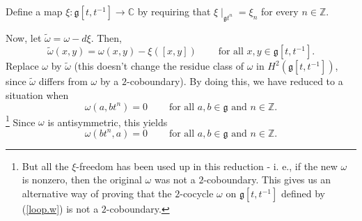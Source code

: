 \documentclass[etingof-lie.tex]{subfiles}
\begin{document}
Define a map $\xi:\mathfrak{g}\left[  t,t^{-1}\right]  \rightarrow\mathbb{C}$
by requiring that $\xi\mid_{\mathfrak{g}t^{n}}=\xi_{n}$ for every
$n\in\mathbb{Z}$.

Now, let $\widetilde{\omega}=\omega-d\xi$. Then,%
\[
\widetilde{\omega}\left(  x,y\right)  =\omega\left(  x,y\right)  -\xi\left(
\left[  x,y\right]  \right)  \ \ \ \ \ \ \ \ \ \ \text{for all }%
x,y\in\mathfrak{g}\left[  t,t^{-1}\right]  .
\]
Replace $\omega$ by $\widetilde{\omega}$ (this doesn't change the residue
class of $\omega$ in $H^{2}\left(  \mathfrak{g}\left[  t,t^{-1}\right]
\right)  $, since $\widetilde{\omega}$ differs from $\omega$ by a
$2$-coboundary). By doing this, we have reduced to a situation when
\[
\omega\left(  a,bt^{n}\right)  =0\ \ \ \ \ \ \ \ \ \ \text{for all }%
a,b\in\mathfrak{g}\text{ and }n\in\mathbb{Z}.
\]
\footnote{But all the $\xi$-freedom has been used up in this reduction - i.
e., if the new $\omega$ is nonzero, then the original $\omega$ was not a
$2$-coboundary. This gives us an alternative way of proving that the
$2$-cocycle $\omega$ on $\mathfrak{g}\left[  t,t^{-1}\right]  $ defined by
(\ref{loop.w}) is not a $2$-coboundary.} Since $\omega$ is antisymmetric, this
yields%
\begin{equation}
\omega\left(  bt^{n},a\right)  =0\ \ \ \ \ \ \ \ \ \ \text{for all }%
a,b\in\mathfrak{g}\text{ and }n\in\mathbb{Z}. \label{thm.H^2(gtt).pf.1}%
\end{equation}
\end{document}
